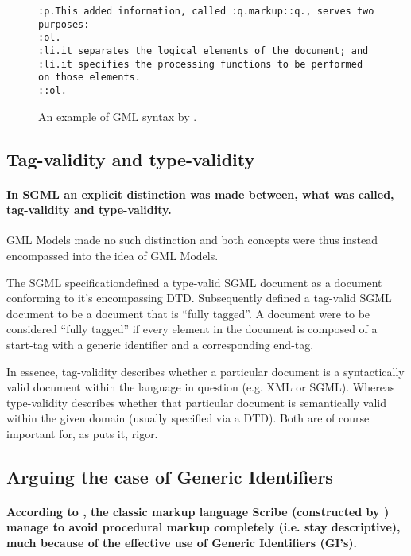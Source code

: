 \documentclass{scrreprt}
\begin{document}
\begin{figure}[h]
\centering
\begin{lstlisting}
:p.This added information, called :q.markup::q., serves two purposes: 
:ol.
:li.it separates the logical elements of the document; and 
:li.it specifies the processing functions to be performed on those elements. 
::ol.
\end{lstlisting}
\caption{An example of GML syntax by \citet{goldfarb}.}
\end{figure}




\subsection{Tag-validity and type-validity}
\label{sec:tag-validity-type-validity}

\paragraph{In SGML an explicit distinction was made between, what was called, tag-validity and type-validity.} GML Models made no such distinction and both concepts were thus instead encompassed into the idea of GML Models.

The SGML specification defined a type-valid SGML document as a document conforming to it's encompassing DTD. Subsequently defined a tag-valid SGML document to be a document that is ``fully tagged''. A document were to be considered ``fully tagged'' if every element in the document is composed of a start-tag with a generic identifier and a corresponding end-tag.

In essence, tag-validity describes whether a particular document is a syntactically valid document within the language in question (e.g. XML or SGML). Whereas type-validity describes whether that particular document is semantically valid within the given domain (usually specified via a DTD). Both are of course important for, as \citet{goldfarb} puts it, rigor.


\subsection{Arguing the case of Generic Identifiers}
\label{sec:arguing-the-case-of-generic-identifiers}
\paragraph{According to \citet{goldfarb}, the classic markup language Scribe (constructed by \citet{reid}) manage to avoid procedural markup completely (i.e. stay descriptive), much because of the effective use of Generic Identifiers (GI's).}
\end{document}
